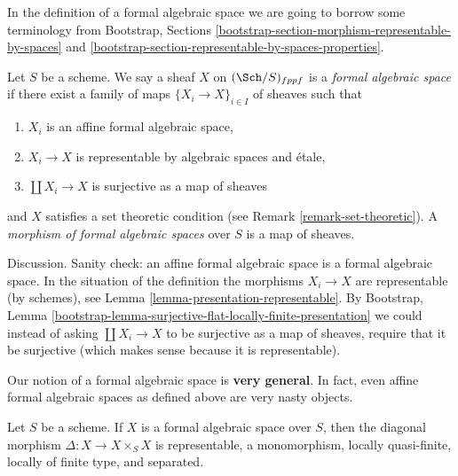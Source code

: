 \medskip\noindent
In the definition of a formal algebraic space we are going to
borrow some terminology from
Bootstrap, Sections
\ref{bootstrap-section-morphism-representable-by-spaces} and
\ref{bootstrap-section-representable-by-spaces-properties}.

\begin{definition}
\label{definition-formal-algebraic-space}
Let $S$ be a scheme. We say a sheaf $X$ on $(\Sch/S)_{fppf}$ is a
{\it formal algebraic space} if there exist a family of maps
$\{X_i \to X\}_{i \in I}$ of sheaves such that
\begin{enumerate}
\item $X_i$ is an affine formal algebraic space,
\item $X_i \to X$ is representable by algebraic spaces and \'etale,
\item $\coprod X_i \to X$ is surjective as a map of sheaves
\end{enumerate}
and $X$ satisfies a set theoretic condition
(see Remark \ref{remark-set-theoretic}). A
{\it morphism of formal algebraic spaces}
over $S$ is a map of sheaves.
\end{definition}

\noindent
Discussion. Sanity check: an affine formal algebraic space is
a formal algebraic space. In the situation of the definition
the morphisms $X_i \to X$ are representable (by schemes), see
Lemma \ref{lemma-presentation-representable}.
By Bootstrap, Lemma
\ref{bootstrap-lemma-surjective-flat-locally-finite-presentation}
we could instead of asking $\coprod X_i \to X$
to be surjective as a map of sheaves, require that it be
surjective (which makes sense because it is representable).

\medskip\noindent
Our notion of a formal algebraic space is {\bf very general}.
In fact, even affine formal algebraic spaces as defined above
are very nasty objects.

\begin{lemma}
\label{lemma-diagonal-formal-algebraic-space}
Let $S$ be a scheme. If $X$ is a formal algebraic space over
$S$, then the diagonal morphism $\Delta : X \to X \times_S X$
is representable, a monomorphism, locally quasi-finite,
locally of finite type, and separated.
\end{lemma}


